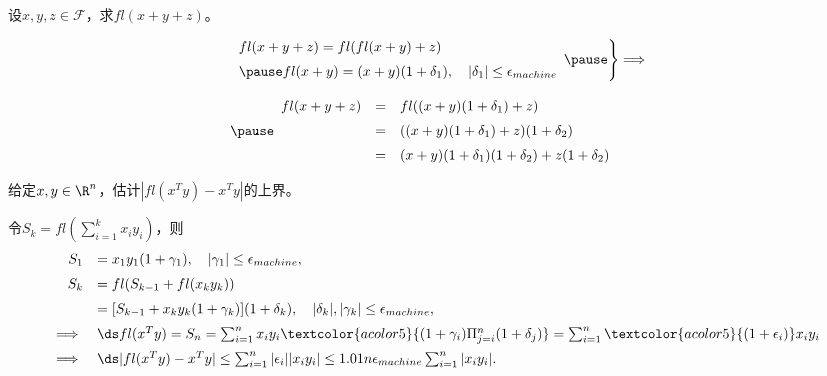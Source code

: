 \begin{frame}\ft{\secname}

\begin{li}
设$x, y, z \in \mathcal{F}$，求$fl(x+y+z)$。
\end{li}
\pause
\begin{jie}
$$
\begin{array}{l}
\left.
\begin{array}{l}
fl(x+y+z) = fl(fl(x+y)+z) \\[0.2cm] \pause 
fl(x+y) = (x+y)(1+\delta_1), \quad |\delta_1| \le \epsilon_{machine} 
\end{array}\pause 
\right\}\Longrightarrow \\[0.3in]
\pause 
\begin{array}{rcl}
  fl(x+y+z) &=& fl((x+y)(1+\delta_1)+z) \\[0.2cm]
&=& ((x+y)(1+\delta_1)+z)(1+\delta_2) \\[0.2cm]
&=& (x+y)(1+\delta_1)(1+\delta_2)+z(1+\delta_2)
\end{array}
\end{array}     
$$
\end{jie}

\end{frame}


\begin{frame}\ft{\secname}

\begin{li}
给定$x, y \in \R^n$，估计$|fl(x^Ty) - x^Ty|$的上界。
\end{li}
\pause
\begin{jie}
令$S_k = fl\left(\sum_{i=1}^k x_i y_i\right)$，则
$$
\begin{array}{rl}
S_1 &= x_1y_1(1+\gamma_1), \quad |\gamma_1| \le \epsilon_{machine}, \\[0.2cm]
S_k &= fl(S_{k-1} + fl(x_ky_k)) \\[0.2cm]
&= [S_{k-1} + x_k y_k (1+\gamma_k)](1+\delta_k), \quad |\delta_k|, |\gamma_k| \le \epsilon_{machine}, \\[0.2cm]
\Longrightarrow~& \ds
fl(x^Ty) = S_n = \sum_{i=1}^n x_iy_i\textcolor{acolor5}{(1+\gamma_i)\Pi_{j=i}^n(1+\delta_j)}
= \sum_{i=1}^n\textcolor{acolor5}{(1+\epsilon_i)}x_iy_i    \\[0.2cm]
\Longrightarrow~& \ds
|fl(x^Ty)-x^Ty| \le \sum_{i=1}^n |\epsilon_i||x_iy_i| \le 1.01 n \epsilon_{machine} 
\sum_{i=1}^n|x_iy_i|.
\end{array}
$$
\end{jie}

\end{frame}

